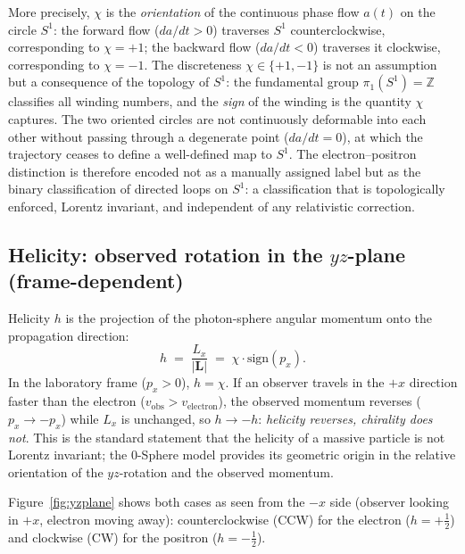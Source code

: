 \documentclass[%
 reprint, amsmath,amssymb, aps, prb, ]{revtex4-2}
\numberwithin{equation}{section}
\begin{document}
More precisely, $\chi$ is the \emph{orientation} of the continuous phase flow $a(t)$ on the circle $S^1$: the forward flow ($da/dt > 0$) traverses $S^1$ counterclockwise, corresponding to $\chi = +1$; the backward flow ($da/dt < 0$) traverses it clockwise, corresponding to $\chi = -1$. The discreteness $\chi \in \{+1, -1\}$ is not an assumption but a consequence of the topology of $S^1$: the fundamental group $\pi_1(S^1) = \mathbb{Z}$ classifies all winding numbers, and the \emph{sign} of the winding is the quantity $\chi$ captures. The two oriented circles are not continuously deformable into each other without passing through a degenerate point ($da/dt = 0$), at which the trajectory ceases to define a well-defined map to $S^1$. The electron--positron distinction is therefore encoded not as a manually assigned label but as the binary classification of directed loops on $S^1$: a classification that is topologically enforced, Lorentz invariant, and independent of any relativistic correction.

\subsection{Helicity: observed rotation in the $yz$-plane (frame-dependent)}
\label{subsec:helicity_def}

Helicity $h$ is the projection of the photon-sphere angular momentum onto the propagation direction:
\begin{equation}
h \;=\; \frac{L_x}{|\mathbf{L}|} \;=\; \chi\cdot\text{sign}(p_x).
\label{eq:helicity_def}
\end{equation}
In the laboratory frame ($p_x>0$), $h=\chi$.
If an observer travels in the $+x$ direction faster than the electron ($v_{\text{obs}}>v_{\text{electron}}$), the observed momentum reverses ($p_x\to -p_x$) while $L_x$ is unchanged, so $h\to -h$: \emph{helicity reverses, chirality does not}.
This is the standard statement that the helicity of a massive particle is not Lorentz invariant; the 0-Sphere model provides its geometric origin in the relative orientation of the $yz$-rotation and the observed momentum.

Figure~\ref{fig:yzplane} shows both cases as seen from the $-x$ side (observer looking in $+x$, electron moving away): counterclockwise (CCW) for the electron ($h=+\tfrac{1}{2}$) and clockwise (CW) for the positron ($h=-\tfrac{1}{2}$).
\end{document}

